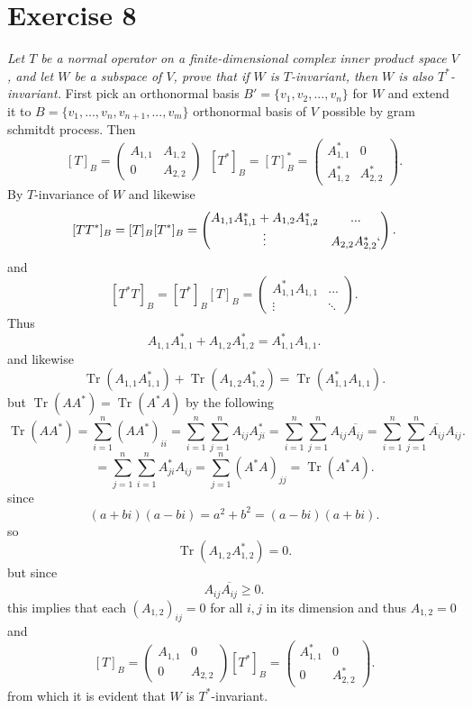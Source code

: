 \documentclass{article}
\DeclareMathOperator{\tr}{Tr}
\begin{document}
    \section{Exercise 8}
    \emph{
        Let $T$ be a normal operator on a finite-dimensional complex inner product space $V$, and let  $W$ be a subspace of $V$,
        prove that if  $W$ is $T$-invariant, then $W$ is also $T^{*}$-invariant.
    }
    First pick an orthonormal basis $B' = \{v_1,v_2,...,v_n\}$ for $W$ and extend it to $B = \{v_1,...,v_n,v_{n+1},...,v_m\}$ orthonormal basis of $V$ possible
    by gram schmitdt process.
    Then
     \[
         [T]_B = \begin{pmatrix} A_{1,1} & A_{1,2} \\ 0 & A_{2,2} \end{pmatrix} \;\;
         [T^{*}]_B = [T]_B^{*} = \begin{pmatrix} 
             A_{1,1}^{*} & 0\\
             A_{1,2}^{*} & A_{2,2}^{*}
         \end{pmatrix} 
    .\] 
    By $T$-invariance of $W$
    and likewise
    \[
        [TT^{*}]_B = [T]_B[T^{*}]_B = \begin{pmatrix} 
            A_{1,1}A^{*}_{1,1} + A_{1,2}A^{*}_{1,2} & ... \\
            \vdots & A_{2,2}A^{*}_{2,2}
        `\end{pmatrix} 
    .\] 
    and
    \[
        [T^{*}T]_B = [T^{*}]_B[T]_B = \begin{pmatrix} 
            A^{*}_{1,1}A_{1,1} & ...\\
            \vdots & \ddots
        \end{pmatrix} 
    .\] 
    Thus
    \[
        A_{1,1}A_{1,1}^{*} + A_{1,2}A_{1,2}^{*} = A^{*}_{1,1}A_{1,1}
    .\] 
    and likewise
    \[
        \tr(A_{1,1}A_{1,1}^{*}) + \tr(A_{1,2}A_{1,2}^{*}) = \tr(A^{*}_{1,1}A_{1,1})
    .\] 
    but $\tr(AA^{*}) = \tr(A^{*}A)$ by the following
    \[
        \tr(AA^{*}) = \sum_{i=1}^{n}(AA^{*})_{ii} = \sum_{i=1}^{n}\sum_{j=1}^{n}A_{ij}A^{*}_{ji} = \sum_{i=1}^{n}\sum_{j=1}^{n}A_{ij}\overline{A_{ij}} = \sum_{i=1}^{n}\sum_{j=1}^{n}\overline{A_{ij}}A_{ij}
    .\] 
    \[
        = \sum_{j=1}^{n}\sum_{i=1}^{n}A^{*}_{ji}A_{ij} = \sum_{j=1}^{n}(A^{*}A)_{jj} = \tr(A^{*}A)
    .\] 
    since
    \[
        (a+bi)(a-bi) = a^2 + b^2 = (a-bi)(a+bi)
    .\] 
    so
    \[
        \tr(A_{1,2}A^{*}_{1,2}) = 0
    .\] 
    but since
    \[
        A_{ij}\overline{A_{ij}} \ge 0
    .\] 
    this implies that each $(A_{1,2})_{ij} = 0$ for all $i,j$ in its dimension and thus  $A_{1,2} = 0$ and
     \[
         [T]_B = \begin{pmatrix} 
         A_{1,1} & 0\\
         0 & A_{2,2}
     \end{pmatrix} 
     [T^{*}]_B = \begin{pmatrix}
         A^{*}_{1,1} & 0\\
         0 & A^{*}_{2,2}
     \end{pmatrix} 
    .\] 
    from which it is evident that $W$ is $T^{*}$-invariant.
\end{document}
